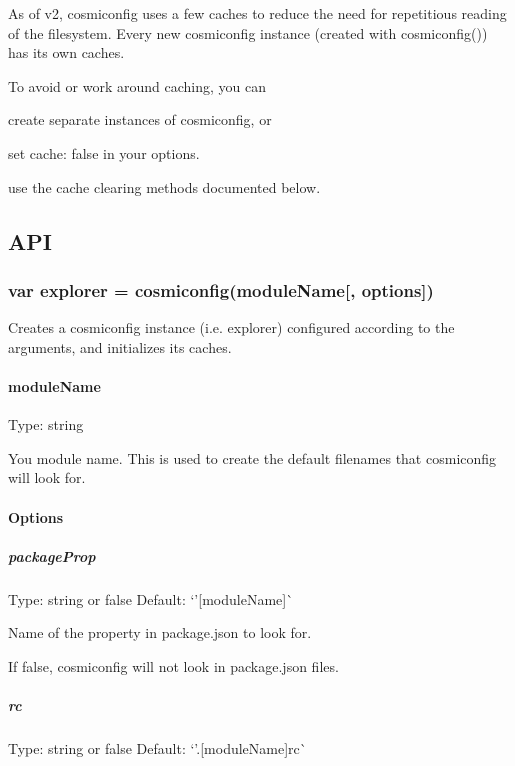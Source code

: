 As of v2, cosmiconfig uses a few caches to reduce the need for repetitious reading of the filesystem. Every new cosmiconfig instance (created with {\ttfamily cosmiconfig()}) has its own caches.

To avoid or work around caching, you can
\begin{DoxyItemize}
\item create separate instances of cosmiconfig, or
\item set {\ttfamily cache\+: false} in your options.
\item use the cache clearing methods documented below.
\end{DoxyItemize}

\subsection*{A\+PI}

\subsubsection*{{\ttfamily var explorer = cosmiconfig(module\+Name\mbox{[}, options\mbox{]})}}

Creates a cosmiconfig instance (i.\+e. explorer) configured according to the arguments, and initializes its caches.

\paragraph*{module\+Name}

Type\+: {\ttfamily string}

You module name. This is used to create the default filenames that cosmiconfig will look for.

\paragraph*{Options}

\subparagraph*{package\+Prop}

Type\+: {\ttfamily string} or {\ttfamily false} Default\+: `'\mbox{[}module\+Name\mbox{]}\textquotesingle{}\`{}

Name of the property in {\ttfamily package.\+json} to look for.

If {\ttfamily false}, cosmiconfig will not look in {\ttfamily package.\+json} files.

\subparagraph*{rc}

Type\+: {\ttfamily string} or {\ttfamily false} Default\+: `'.\mbox{[}module\+Name\mbox{]}rc\textquotesingle{}\`{}

